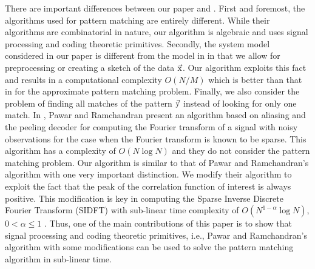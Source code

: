 There are important differences between our paper and \cite{hassanieh2012faster,andoni2013shift,boyer1977fast,amir2004faster}. First and foremost, the algorithms used for pattern matching are entirely different. While their algorithms are combinatorial in nature, our algorithm is algebraic and uses signal processing and coding theoretic primitives. Secondly, the system model considered in our paper is different from the model in \cite{hassanieh2012faster,andoni2013shift,boyer1977fast,amir2004faster} in that we allow for preprocessing or creating a sketch of the data $\vec{\mathrm{x}}$. Our algorithm exploits this fact and results in a computational complexity $O(N/M)$ which is better than that in \cite{andoni2013shift} for the approximate pattern matching problem.  Finally, we also consider the problem of finding all matches of the pattern $\vec{\mathrm{y}}$ instead of looking for only one match. In \cite{pawar2014robust}, Pawar and Ramchandran present an algorithm based on aliasing and the peeling decoder for computing the Fourier transform of a signal with noisy observations for the case when the Fourier transform is known to be sparse. This algorithm has a complexity of $O(N \log N)$ and they do not consider the pattern matching problem. Our algorithm is similar to that of Pawar and Ramchandran's algorithm with one very important distinction. We modify their algorithm to exploit the fact that the peak of the correlation function of interest is always positive. This modification is key in computing the Sparse Inverse Discrete Fourier Transform (SIDFT) with sub-linear time complexity of $O(N^{1-\alpha} \log N)$, $0 < \alpha \leq 1$ . Thus, one of the main contributions of this paper is to show that signal processing and coding theoretic primitives, i.e., Pawar and Ramchandran's algorithm with some modifications can be used to solve the pattern matching algorithm in sub-linear time. 